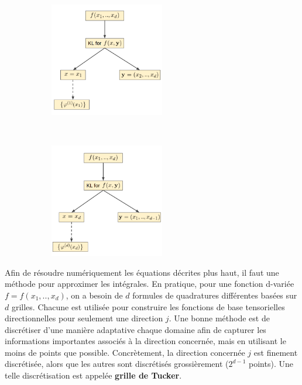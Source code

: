 \begin{center}
\begin{figure}[!h]
    \centering
    \begin{subfigure}[b]{0.45\textwidth}
				\includegraphics[width=\linewidth,height=5cm]{images/tucker_x1.png}
    \end{subfigure}
		~
    \begin{subfigure}[b]{0.45\textwidth}
        \includegraphics[width=\linewidth,height=5cm]{images/tucker_xd.png}
    \end{subfigure}
\end{figure}
\label{figure:tuckerprocess}
\end{center}
Afin de résoudre numériquement les équations décrites plus haut, il faut une méthode pour approximer les intégrales. En pratique, pour une fonction d-variée $f = f(x_1,..,x_d)$, on a besoin de $d$ formules de quadratures différentes basées sur $d$ grilles. Chacune est utilisée pour construire les fonctions de base tensorielles directionnelles pour seulement une direction $j$. Une bonne méthode est de discrétiser d'une manière adaptative chaque domaine afin de capturer les informations importantes associés à la direction concernée, mais en utilisant le moins de points que possible. Concrètement, la direction concernée $j$ est finement discrétisée, alors que les autres sont discrétisés grossièrement ($2^{d-1}$ points). Une telle discrétisation est appelée \textbf{grille de Tucker}. \\
